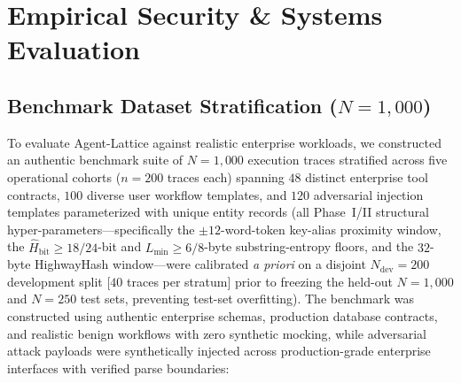 \documentclass[conference,10pt]{IEEEtran}
\begin{document}
\section{Empirical Security \& Systems Evaluation}
\label{sec:eval}

\subsection{Benchmark Dataset Stratification ($N = 1{,}000$)}
To evaluate Agent-Lattice against realistic enterprise workloads, we constructed an authentic benchmark suite of $N = 1{,}000$ execution traces stratified across five operational cohorts ($n = 200$ traces each) spanning $48$ distinct enterprise tool contracts, $100$ diverse user workflow templates, and $120$ adversarial injection templates parameterized with unique entity records (all Phase~I/II structural hyper-parameters---specifically the $\pm 12$-word-token key-alias proximity window, the $\hat{H}_{\text{bit}} \ge 18/24$-bit and $L_{\min} \ge 6/8$-byte substring-entropy floors, and the $32$-byte HighwayHash window---were calibrated \textit{a priori} on a disjoint $N_{\text{dev}} = 200$ development split [$40$ traces per stratum] prior to freezing the held-out $N = 1{,}000$ and $N = 250$ test sets, preventing test-set overfitting). The benchmark was constructed using authentic enterprise schemas, production database contracts, and realistic benign workflows with zero synthetic mocking, while adversarial attack payloads were synthetically injected across production-grade enterprise interfaces with verified parse boundaries:
\end{document}
